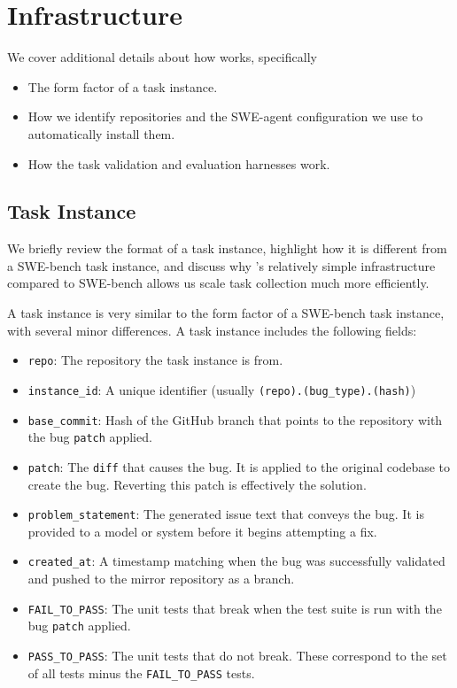 \section{Infrastructure}
\label{appx:infra}
We cover additional details about how \bugs{} works, specifically
\begin{itemize}
    \item The form factor of a \bugs{} task instance.
    \item How we identify repositories and the SWE-agent configuration we use to automatically install them.
    \item How the task validation and evaluation harnesses work.
\end{itemize}

\subsection{\bugs{} Task Instance}
\label{appx:infra:anatomy}
We briefly review the format of a \bugs{} task instance, highlight how it is different from a SWE-bench task instance, and discuss why \bugs{}'s relatively simple infrastructure compared to SWE-bench allows us scale task collection much more efficiently.

A \bugs{} task instance is very similar to the form factor of a SWE-bench task instance, with several minor differences.
A \bugs{} task instance includes the following fields:
\begin{itemize}
    \item \texttt{repo}: The repository the task instance is from.
    \item \texttt{instance\_id}: A unique identifier (usually \texttt{(repo).(bug\_type).(hash)})
    \item \texttt{base\_commit}: Hash of the GitHub branch that points to the repository with the bug \texttt{patch} applied.
    \item \texttt{patch}: The \texttt{diff} that causes the bug. It is applied to the original codebase to create the bug. Reverting this patch is effectively the solution.
    \item \texttt{problem\_statement}: The generated issue text that conveys the bug.
    It is provided to a model or system before it begins attempting a fix.
    \item \texttt{created\_at}: A timestamp matching when the bug was successfully validated and pushed to the mirror repository as a branch.
    \item \texttt{FAIL\_TO\_PASS}: The unit tests that break when the test suite is run with the bug \texttt{patch} applied.
    \item \texttt{PASS\_TO\_PASS}: The unit tests that do not break.
    These correspond to the set of all tests minus the \texttt{FAIL\_TO\_PASS} tests.
\end{itemize}

